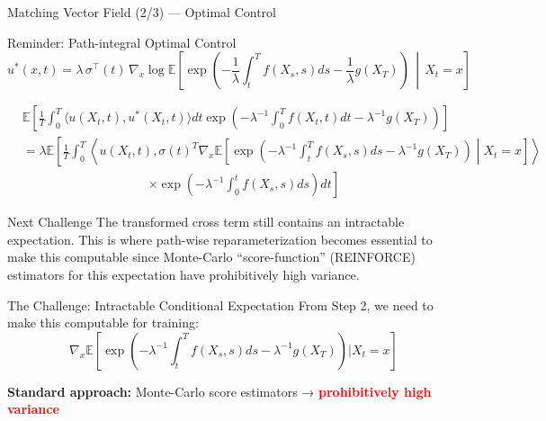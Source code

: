 \documentclass[aspectratio=169,xcolor=dvipsnames]{beamer}
\begin{document}
\begin{frame}[allowframebreaks]{Matching Vector Field (2/3) — Optimal Control}
        \begin{block}{Reminder: Path-integral Optimal Control}
        $$u^*(x,t) = \lambda \, \sigma^\top(t) \, \nabla_x \log \mathbb{E}\left[\exp\left(-\frac{1}{\lambda}\int_t^T f(X_s,s) ds - \frac{1}{\lambda} g(X_T)\right) \,\middle|\, X_t = x\right]$$

    \end{block}

    \begin{equation}
    \begin{aligned}
    &\mathbb{E}\left[\frac{1}{T}\int_0^T \langle u(X_t,t), u^*(X_t,t)\rangle dt \exp\left(-\lambda^{-1}\int_0^T f(X_t,t) dt - \lambda^{-1}g(X_T)\right)\right] \\[8pt]
    &= \lambda \mathbb{E}\left[\frac{1}{T}\int_0^T \left\langle u(X_t,t), \sigma(t)^T \nabla_x \mathbb{E}\left[\exp\left(-\lambda^{-1}\int_t^T f(X_s,s) ds - \lambda^{-1}g(X_T)\right) \middle| X_t = x\right]\right\rangle \right. \\[4pt]
    &\qquad\qquad\qquad\qquad\qquad \left. \times \exp\left(-\lambda^{-1}\int_0^t f(X_s,s) ds\right) dt\right]
    \end{aligned}
    \end{equation}
    
    \vspace{0.5cm}
    
    \begin{alertblock}{Next Challenge}
        The transformed cross term still contains an intractable expectation. This is where path-wise reparameterization becomes essential to make this computable since
        Monte-Carlo “score-function” (REINFORCE) estimators for this expectation have prohibitively high variance.
    \end{alertblock}

    \begin{block}{The Challenge: Intractable Conditional Expectation}
        From Step 2, we need to make this computable for training:
        $$\nabla_x \mathbb{E}\left[\exp\left(-\lambda^{-1}\int_t^T f(X_s,s)ds - \lambda^{-1}g(X_T)\right) \bigg| X_t = x\right]$$
        
        \textbf{Standard approach:} Monte-Carlo score estimators → \textcolor{red}{\textbf{prohibitively high variance}}
    \end{block}
    
    \vspace{0.5cm}

\end{frame}
\end{document}
